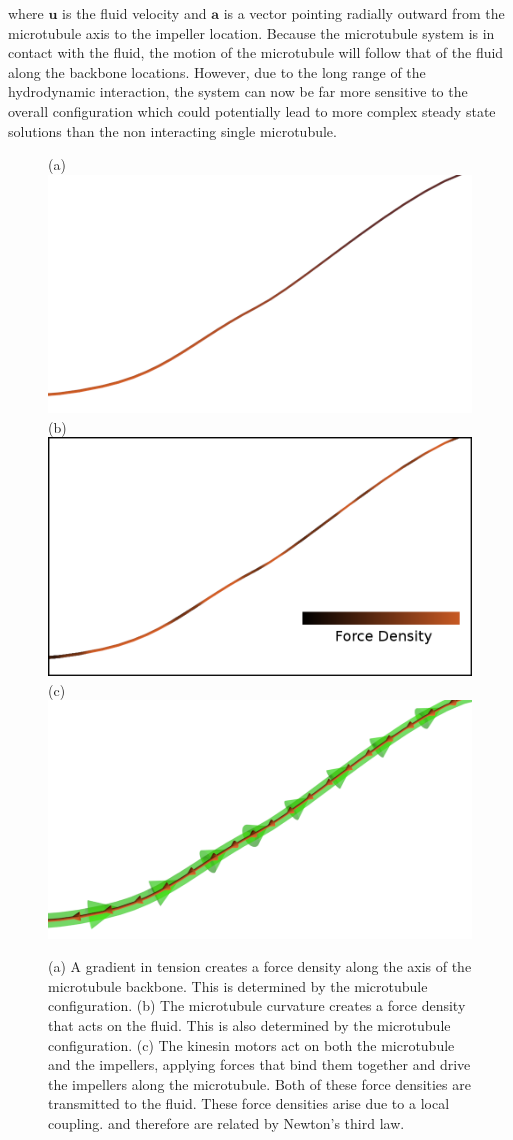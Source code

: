 \documentclass[11pt]{ucthesis}
\begin{document}
where $ \mathbf{u}$ is the fluid velocity and $ \mathbf{a}$ is a vector pointing radially outward from the microtubule axis to the impeller location. 
Because the microtubule system is in contact with the fluid, the motion of the microtubule will follow that of the fluid along the backbone locations.
However, due to the long range of the hydrodynamic interaction, the system can now be far more sensitive to the overall configuration which could potentially lead to more complex steady state solutions than the non interacting single microtubule.


\begin{figure}[htp]
\begin{center}
(a)
\includegraphics[width=0.45\hsize]{gradforces.png}
(b)
\includegraphics[width=0.45\hsize]{stiffforces2.png}
(c)
\includegraphics[width=0.45\hsize]{ktforces.png}
\caption{ 
(a)
A gradient in tension creates a force density along the axis of the microtubule backbone. This is determined by the microtubule configuration.
(b)
The microtubule curvature creates a force density that acts on the fluid. This is also determined by the microtubule configuration.
(c)
The kinesin motors act on both the microtubule and the impellers, applying forces that bind them together and drive the impellers along the microtubule. Both of these force densities are transmitted to the fluid. These force densities arise due to a local coupling. and therefore are related by Newton's third law.
}
\label{fig:forcedensities}
\end{center}
\end{figure}
\end{document}
